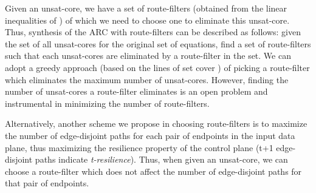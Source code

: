 Given an unsat-core, we have a set of route-filters (obtained
from the linear inequalities of ) of which we 
need to choose one to eliminate this unsat-core. Thus, synthesis 
of the ARC with route-filters can be 
described as follows: given the set of all
unsat-cores for the original set of equations, find a 
set of route-filters such that each unsat-cores are eliminated
by a route-filter in the set. 
We can 
adopt a greedy approach (based on the lines of 
set cover \cite{}) of picking a route-filter which 
eliminates the maximum number of unsat-cores. However, 
finding the number of unsat-cores a route-filter eliminates
is an open problem and instrumental in minimizing the number 
of route-filters.

Alternatively, another scheme we propose in choosing route-filters
is to maximize the number of edge-disjoint paths for each pair of
endpoints in the input data plane, thus maximizing the resilience 
property of the control plane (t+1 edge-disjoint paths indicate
{\em t-resilience}). Thus, when given an unsat-core, we can choose
a route-filter which does not affect the number of edge-disjoint paths
for that pair of endpoints.




